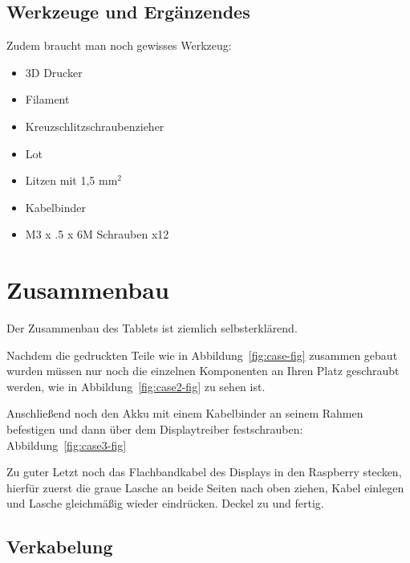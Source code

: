 \subsection{Werkzeuge und Ergänzendes}
Zudem braucht man noch gewisses Werkzeug:
\begin{itemize}
\item 3D Drucker 
\item Filament  
\item Kreuzschlitzschraubenzieher 
\item Lot 
\item Litzen mit 1,5 mm$^2$
\item Kabelbinder
\item M3 x .5 x 6M Schrauben x12
\end{itemize}

\section{Zusammenbau}

Der Zusammenbau des Tablets ist ziemlich selbsterklärend.


Nachdem die gedruckten Teile wie in Abbildung~\ref{fig:case-fig} zusammen gebaut wurden müssen nur noch die einzelnen Komponenten an Ihren Platz geschraubt werden, wie in Abbildung~\ref{fig:case2-fig} zu sehen ist.


Anschließend noch den Akku mit einem Kabelbinder an seinem Rahmen befestigen und dann über dem Displaytreiber festschrauben: Abbildung~\ref{fig:case3-fig}


Zu guter Letzt noch das Flachbandkabel des Displays in den Raspberry stecken, hierfür zuerst die graue Lasche an beide Seiten nach oben ziehen, Kabel einlegen und Lasche gleichmäßig wieder eindrücken. Deckel zu und fertig.


\subsection{Verkabelung}

